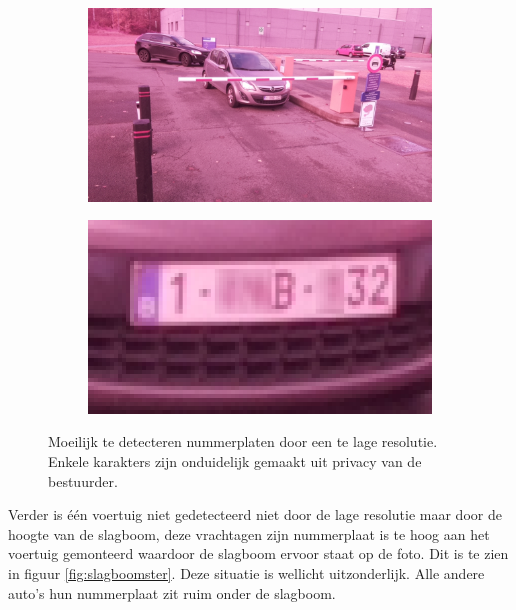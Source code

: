 \begin{figure}[h!]
	\centering
	\begin{subfigure}[b]{0.49\linewidth}
		\includegraphics[width=\linewidth]{img/sterachter/sterachter1.jpg}
	\end{subfigure}
	\begin{subfigure}[b]{0.49\linewidth}
		\includegraphics[width=\linewidth]{img/sterachter/sterachter2.png}
	\end{subfigure}
	\caption{Moeilijk te detecteren nummerplaten door een te lage resolutie. Enkele karakters zijn onduidelijk gemaakt uit privacy van de bestuurder.}
	\label{fig:lowressterre}
\end{figure}

Verder is één voertuig niet gedetecteerd niet door de lage resolutie maar door de hoogte van de slagboom, deze vrachtagen zijn nummerplaat is te hoog aan het voertuig gemonteerd waardoor de slagboom ervoor staat op de foto. Dit is te zien in figuur \ref{fig:slagboomster}. Deze situatie is wellicht uitzonderlijk. Alle andere auto's hun nummerplaat zit ruim onder de slagboom.

